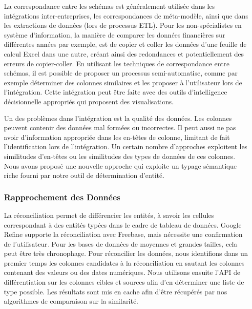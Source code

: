La correspondance entre les sch\'{e}mas est g\'{e}n\'{e}ralement utilis\'{e}e dans les int\'{e}grations inter-entreprises, les correspondances de m\'{e}ta-mod\`{e}le, ainsi que dans les extractions de donn\'{e}es (lors de processus ETL). Pour les non-sp\'{e}cialistes en syst\`{e}me d'information, la mani\`{e}re de comparer les donn\'{e}es financi\`{e}res sur diff\'{e}rentes ann\'{e}es par exemple, est de copier et coller les donn\'{e}es d'une feuille de calcul Excel dans une autre, cr\'{e}ant ainsi des redondances et potentiellement des erreurs de copier-coller. En utilisant les techniques de correspondance entre sch\'{e}mas, il est possible de proposer un processus semi-automatise, comme par exemple d\'{e}terminer des colonnes similaires et les proposer à l'utilisateur lors de l'int\'{e}gration. Cette int\'{e}gration peut être faite avec des outils d'intelligence d\'{e}cisionnelle appropri\'{e}s qui proposent des visualisations.

Un des probl\`{e}mes dans l'int\'{e}gration est la qualit\'{e} des donn\'{e}es. Les colonnes peuvent contenir des donn\'{e}es mal form\'{e}es ou incorrectes. Il peut aussi ne pas avoir d'information appropri\'{e}e dans les en-têtes de colonne, limitant de fait l'identification lors de l'int\'{e}gration. Un certain nombre d'approches exploitent les similitudes d'en-têtes ou les similitudes des types de donn\'{e}es de ces colonnes. Nous avons propos\'{e} une nouvelle approche qui exploite un typage s\'{e}mantique riche fourni par notre outil de d\'{e}termination d'entit\'{e}.

\subsubsection{Rapprochement des Donn\'{e}es}
La r\'{e}conciliation permet de diff\'{e}rencier les entit\'{e}s, à savoir les cellules correspondant à des entit\'{e}s typ\'{e}es dans le cadre de tableau de donn\'{e}es. Google Refine supporte la r\'{e}conciliation avec Freebase, mais n\'{e}cessite une confirmation de l'utilisateur. Pour les bases de donn\'{e}es de moyennes et grandes tailles, cela peut être tr\`{e}s chronophage. Pour r\'{e}concilier les donn\'{e}es, nous identifions dans un premier temps les colonnes candidates à la r\'{e}conciliation en sautant les colonnes contenant des valeurs ou des dates num\'{e}riques. Nous utilisons ensuite l'API de diff\'{e}rentiation sur les colonnes cibles et sources afin d'en d\'{e}terminer une liste de type possible. Les r\'{e}sultats sont mis en cache afin d'être r\'{e}cup\'{e}r\'{e}s par nos algorithmes de comparaison sur la similarit\'{e}.

